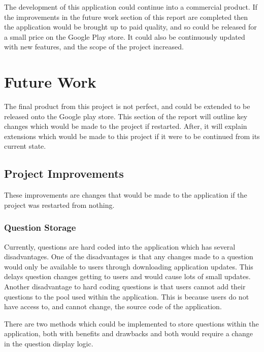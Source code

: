 \documentclass{article}
\begin{document}
The development of this application could continue into a commercial product. If the improvements in the future work section of this report are completed then the application would be brought up to paid quality, and so could be released for a small price on the Google Play store. It could also be continuously updated with new features, and the scope of the project increased. \par

\section{Future Work}
\label{section:futureWork}

The final product from this project is not perfect, and could be extended to be released onto the Google play store. This section of the report will outline key changes which would be made to the project if restarted. After, it will explain extensions which would be made to this project if it were to be continued from its current state. \par

\subsection{Project Improvements}

These improvements are changes that would be made to the application if the project was restarted from nothing.

\subsubsection{Question Storage}

Currently, questions are hard coded into the application which has several disadvantages. One of the disadvantages is that any changes made to a question would only be available to users through downloading application updates. This delays question changes getting to users and would cause lots of small updates. Another disadvantage to hard coding questions is that users cannot add their questions to the pool used within the application. This is because users do not have access to, and cannot change, the source code of the application. \par

There are two methods which could be implemented to store questions within the application, both with benefits and drawbacks and both would require a change in the question display logic. \par
\end{document}
